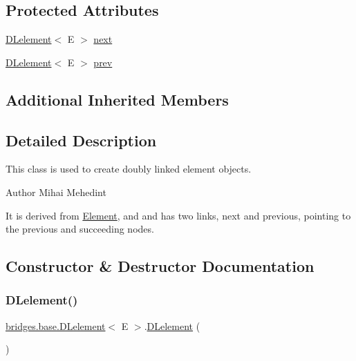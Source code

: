 \subsection*{Protected Attributes}
\begin{DoxyCompactItemize}
\item 
\hyperlink{classbridges_1_1base_1_1_d_lelement}{D\+Lelement}$<$ E $>$ \hyperlink{classbridges_1_1base_1_1_d_lelement_ae2672f6718bf5e1758386d33e59d9340}{next}
\item 
\hyperlink{classbridges_1_1base_1_1_d_lelement}{D\+Lelement}$<$ E $>$ \hyperlink{classbridges_1_1base_1_1_d_lelement_a6eba4876f820b75ac6bde01d7dea9da7}{prev}
\end{DoxyCompactItemize}
\subsection*{Additional Inherited Members}


\subsection{Detailed Description}
This class is used to create doubly linked element objects. 

\begin{DoxyAuthor}{Author}
Mihai Mehedint
\end{DoxyAuthor}
It is derived from \hyperlink{classbridges_1_1base_1_1_element}{Element}, and and has two links, next and previous, pointing to the previous and succeeding nodes. 

\subsection{Constructor \& Destructor Documentation}
\hypertarget{classbridges_1_1base_1_1_d_lelement_a525b572340e161d9c430baff10b64ab2}{}\label{classbridges_1_1base_1_1_d_lelement_a525b572340e161d9c430baff10b64ab2} 
\subsubsection{\texorpdfstring{D\+Lelement()}{DLelement()}\hspace{0.1cm}{\footnotesize\ttfamily [1/4]}}
{\footnotesize\ttfamily \hyperlink{classbridges_1_1base_1_1_d_lelement}{bridges.\+base.\+D\+Lelement}$<$ E $>$.\hyperlink{classbridges_1_1base_1_1_d_lelement}{D\+Lelement} (\begin{DoxyParamCaption}{ }\end{DoxyParamCaption})}


